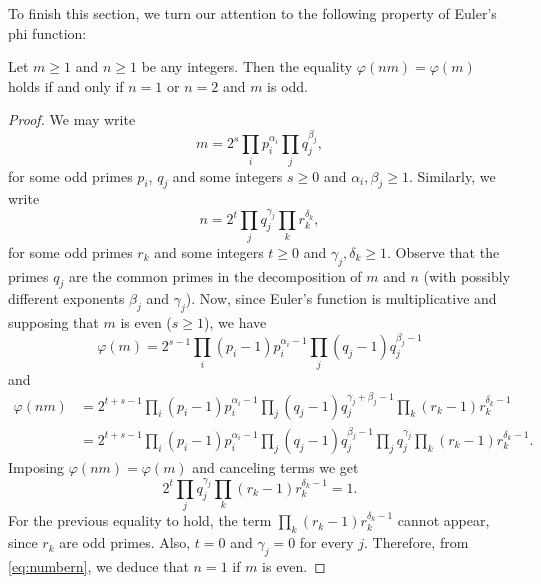 \documentclass[../main.tex]{subfiles}
\begin{document}
To finish this section, we turn our attention to the following property of Euler's phi function:

\begin{lemma}\label{lemma:propertyeulerphi}
	Let $m\geqslant 1$ and $n\geqslant 1$ be any integers. Then the equality $\varphi(nm)=\varphi(m)$ holds if and only if $n=1$ or $n=2$ and $m$ is odd.
\end{lemma}
\begin{proof}
	We may write
	\begin{equation*}
		m=2^s\prod_i p_i^{\alpha_i}\prod_j q_j^{\beta_j},
	\end{equation*}
	for some odd primes $p_i$, $q_j$ and some integers $s\geqslant 0$ and $\alpha_i,\beta_j \geqslant 1$. Similarly, we write
	\begin{equation}\label{eq:numbern}
		n=2^t\prod_j q_j^{\gamma_j}\prod_k r_k^{\delta_k},
	\end{equation}
	for some odd primes $r_k$ and some integers $t\geqslant 0$ and $\gamma_j,\delta_k\geqslant 1$. Observe that the primes $q_j$ are the common primes in the decomposition of $m$ and $n$ (with possibly different exponents $\beta_j$ and $\gamma_j$). Now, since Euler's function is multiplicative and supposing that $m$ is even ($s\geqslant 1$), we have
	\begin{equation*}
		\varphi(m)=2^{s-1}\prod_i(p_i-1)p_i^{\alpha_i-1}\prod_j(q_j-1)q_j^{\beta_j-1}
	\end{equation*}
	and 
	\begin{align*}
		\varphi(nm)&=2^{t+s-1}\prod_i(p_i-1)p_i^{\alpha_i-1}\prod_j(q_j-1)q_j^{\gamma_j+\beta_j-1}\prod_k(r_k-1)r_k^{\delta_k-1}\\
		&=2^{t+s-1}\prod_i(p_i-1)p_i^{\alpha_i-1}\prod_j(q_j-1)q_j^{\beta_j-1}\prod_jq_j^{\gamma_j}\prod_k(r_k-1)r_k^{\delta_k-1}.
	\end{align*}
	Imposing $\varphi(nm)=\varphi(m)$ and canceling terms we get
	\begin{equation*}
		2^t\prod_jq_j^{\gamma_j}\prod_k(r_k-1)r_k^{\delta_k-1}=1.
	\end{equation*}
	For the previous equality to hold, the term $\prod_k(r_k-1)r_k^{\delta_k-1}$ cannot appear, since $r_k$ are odd primes. Also, $t=0$ and $\gamma_j=0$ for every $j$. Therefore, from \cref{eq:numbern}, we deduce that $n=1$ if $m$ is even.
	

\end{proof}
\end{document}
